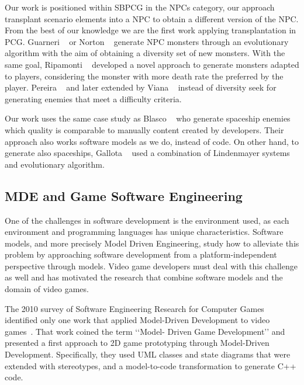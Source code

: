 Our work is positioned within SBPCG in the NPCs category, our approach transplant scenario elements into a NPC to obtain a different version of the NPC. From the best of our knowledge we are the first work applying transplantation in PCG. Guarneri \etal~\cite{guarneri2013golem} or Norton \etal~\cite{norton2017monsters}  generate NPC monsters through an evolutionary algorithm with the aim of obtaining a diversity set of new monsters. With the same goal, Ripamonti \etal~\cite{ripamonti2021dragon} developed a novel approach to generate monsters adapted to players, considering the monster with more death rate the preferred by the player.
Pereira \etal~\cite{pereira2021procedural_enemies} and later extended by Viana \etal~\cite{viana2022illuminating} instead of diversity seek for generating enemies that meet a difficulty criteria.

Our work uses the same case study as Blasco \etal~\cite{blasco2021evolutionary} who generate spaceship enemies which quality is comparable to manually content created by developers. Their approach also works software models as we do, instead of code. On other hand, to generate also spaceships, Gallota \etal~\cite{gallotta2022evolving} used a combination of Lindenmayer systems~\cite{lindenmayer1968mathematical} and evolutionary algorithm.

\subsection{MDE and Game Software Engineering}

One of the challenges in software development is the environment used, as each environment and programming languages has unique characteristics. Software models, and more precisely Model Driven Engineering, study how to alleviate this problem by approaching software development from a platform-independent perspective through models. Video game developers must deal with this challenge as well and has motivated the research that combine software models and the domain of video games. 

The 2010 survey of Software Engineering Research for Computer Games~\cite{ampatzoglou2010software} identified only one work that applied Model-Driven Development to video games~\cite{reyno2009automatic}. That work coined the term ‘‘Model- Driven Game Development’’ and presented a first approach to 2D game prototyping through Model-Driven Development. Specifically, they used UML classes and state diagrams that were extended with stereotypes, and a model-to-code transformation to generate C++ code.

